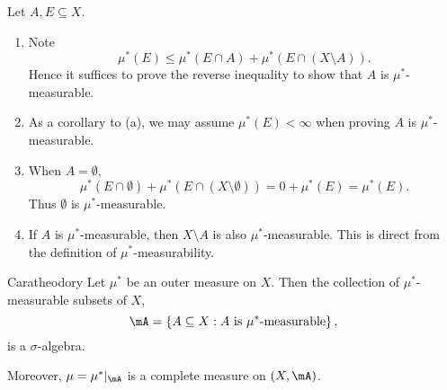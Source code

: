 \documentclass[pmath451]{subfiles}
\begin{document}
    \np Let $A,E\subseteq X$.
    \begin{enumerate}
        \item Note
            \begin{equation*}
                \mu^{*}\left( E \right) \leq \mu^{*}\left( E\cap A \right) + \mu^{*}\left( E\cap\left( X\setminus A \right) \right).
            \end{equation*}
            Hence it suffices to prove the reverse inequality to show that $A$ is $\mu^{*}$-measurable.

        \item As a corollary to (a), we may assume $\mu^{*}\left( E \right)<\infty$ when proving $A$ is $\mu^{*}$-measurable.

        \item When $A=\emptyset$,
            \begin{equation*}
                \mu^{*}\left( E\cap\emptyset \right) + \mu^{*}\left( E\cap\left( X\setminus\emptyset \right) \right) = 0+\mu^{*}\left( E \right) = \mu^{*}\left( E \right).
            \end{equation*}
            Thus $\emptyset$ is $\mu^{*}$-measurable.

        \item If $A$ is $\mu^{*}$-measurable, then $X\setminus A$ is also $\mu^{*}$-measurable. This is direct from the definition of $\mu^{*}$-measurability.
    \end{enumerate}
    
    \begin{theorem}{Caratheodory}
        Let $\mu^{*}$ be an outer measure on $X$. Then the collection of $\mu^{*}$-measurable subsets of $X$,
        \begin{equation*}
            \mA = \left\lbrace A\subseteq X: \text{$A$ is $\mu^{*}$-measurable} \right\rbrace,
        \end{equation*}
        is a $\sigma$-algebra.

        Moreover, $\mu = \mu^{*}|_{\mA}$ is a complete measure on $\left( X,\mA \right)$.
    \end{theorem}
    
\end{document}
